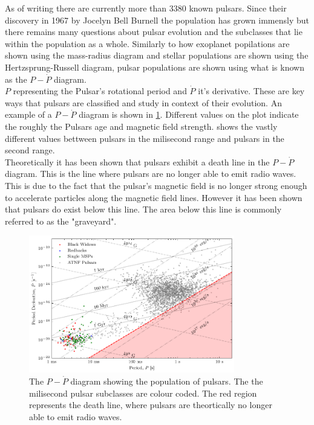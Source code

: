 As of writing there are currently more than 3380 known pulsars. Since their discovery in 1967 by Jocelyn Bell Burnell the population has grown immensly but there remains many questions about pulsar evolution and the subclasses that lie within the population as a whole. Similarly to how exoplanet popilations are shown using the mass-radius diagram and stellar populations are shown using the Hertzsprung-Russell diagram, pulsar populations are shown using what is known as the $P-\dot P$ diagram. \\

$P$ representing the Pulsar's rotational period and $\dot P$ it's derivative. These are key ways that pulsars are classified and study in context of their evolution. An example of a $P-\dot P$ diagram is shown in \cref{fig:p-pdot}. Different values on the plot indicate the roughly the Pulsars age and magnetic field strength.  shows the vastly different values bettween pulsars in the milisecond range and pulsars in the second range. \\ 

Theoretically it has been shown that pulsars exhibit a death line in the $P-\dot P$ diagram. This is the line where pulsars are no longer able to emit radio waves. This is due to the fact that the pulsar's magnetic field is no longer strong enough to accelerate particles along the magnetic field lines. However it has been shown that pulsars do exist below this line. The area below this line is commonly referred to as the "graveyard". \\
\begin{figure}
    \centering
    \includegraphics[width=0.8\textwidth]{figs/PPdot-diagram.pdf}
    \caption{The $P-\dot P$ diagram showing the population of pulsars. The the milisecond pulsar subclasses are colour coded. The red region represents the death line, where pulsars are theortically no longer able to emit radio waves.}
    \label{fig:p-pdot}
\end{figure}


